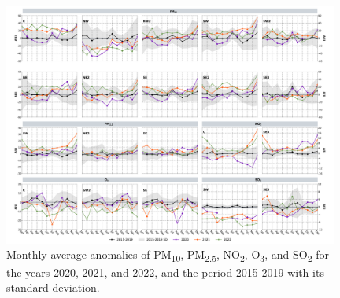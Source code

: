 \documentclass[preprint,12pt]{elsarticle}
\begin{document}
\begin{figure}[H]
	\begin{center}
		\includegraphics[width=0.98\textwidth]{figures/pollutant_anomalies.pdf}
		\caption{Monthly average anomalies of PM\textsubscript{10},
			PM\textsubscript{2.5}, NO\textsubscript{2}, O\textsubscript{3}, and
			SO\textsubscript{2} for the years 2020, 2021, and 2022, and the period
			2015-2019 with its standard deviation.
				{\label{313958}}}
	\end{center}
\end{figure}
\end{document}
